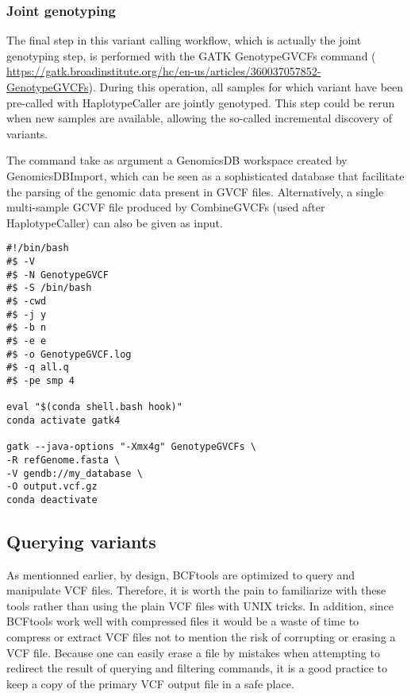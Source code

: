 \subsubsection{Joint genotyping}

The final step in this variant calling workflow, which is actually the joint genotyping step, is performed with the GATK GenotypeGVCFs command (  \href{https://gatk.broadinstitute.org/hc/en-us/articles/360037057852-GenotypeGVCFs}{https://gatk.broadinstitute.org/hc/en-us/articles/360037057852-GenotypeGVCFs}). During this operation, all samples for which variant have been pre-called with HaplotypeCaller are jointly genotyped. This step could be rerun when new samples are available, allowing the so-called incremental discovery of variants.


The command take as argument a GenomicsDB workspace created by GenomicsDBImport, which can be seen as a sophisticated database that facilitate the parsing of the genomic data present in GVCF files. Alternatively, a single multi-sample GCVF file produced by CombineGVCFs (used after HaplotypeCaller) can also be given as input.

\begin{verbatim}
#!/bin/bash
#$ -V
#$ -N GenotypeGVCF
#$ -S /bin/bash
#$ -cwd
#$ -j y
#$ -b n
#$ -e e
#$ -o GenotypeGVCF.log
#$ -q all.q
#$ -pe smp 4

eval "$(conda shell.bash hook)"
conda activate gatk4

gatk --java-options "-Xmx4g" GenotypeGVCFs \
-R refGenome.fasta \
-V gendb://my_database \
-O output.vcf.gz
conda deactivate
\end{verbatim}




\subsection{Querying variants}


As mentionned earlier, by design, BCFtools are optimized to query and manipulate VCF files. Therefore, it is worth the pain to familiarize with these tools rather than using the plain VCF files with UNIX tricks. In addition, since BCFtools work well with compressed files it would be a waste of time to compress or extract VCF files not to mention the risk of corrupting or erasing a VCF file. Because one can easily erase a file by mistakes when attempting to redirect the result of querying and filtering commands, it is a good practice to keep a copy of the primary VCF output file in a safe place.

